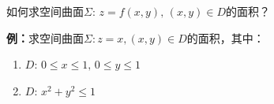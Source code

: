如何求空间曲面$\Sigma:\,z=f(x,y),\,(x,y)\in D$的面积？

{\bf 例：}求空间曲面$\Sigma:z=x,(x,y)\in D$的面积，其中：
\begin{enumerate}[(1)]
  \setlength{\itemindent}{1cm}
  \item $D:\,0\leq x\leq 1,\,0\leq y\leq 1$
  \item $D:\,x^2+y^2\leq 1$
\end{enumerate}

\begin{center}
	\hspace{3cm}
\end{center}

